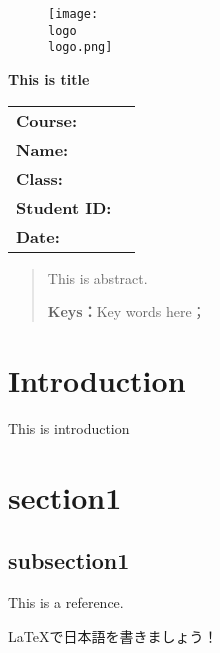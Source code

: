 \documentclass[14pt, a4paper, oneside]{ctexart}
\begin{document}
\thispagestyle{empty}

\begin{figure}[t]
    \centering
    \texttt{[image: \\logo\\logo.png]}
\end{figure}

\vspace*{\fill}
    \begin{center}
        \Huge\textbf{This is title}
    \end{center}
\vspace*{\fill}

\begin{table}[b] %
    \centering
    \large
    \begin{tabular}{ll}
    \textbf{Course:} &  \\
    \textbf{Name:} &  \\
    \textbf{Class:} &  \\
    \textbf{Student ID:}&  \\
    \textbf{Date:} &   \\
    \end{tabular}
\end{table}

\newpage

\thispagestyle{empty}
\begin{abstract}
This is abstract.
    
    \par\textbf{Keys：}Key words here；
\end{abstract}

\newpage
{}
\setcounter{page}{1}
\renewcommand\contentsname{Catalogue}
\tableofcontents

\newpage
\setcounter{page}{1}

\section{Introduction}
This is introduction

\section{section1}
\subsection{subsection1}

\newpage
\renewcommand\refname{Reference}
\begin{thebibliography}{99}
This is a reference.
\end{thebibliography}
\LaTeX で日本語を書きましょう！
\end{document}
